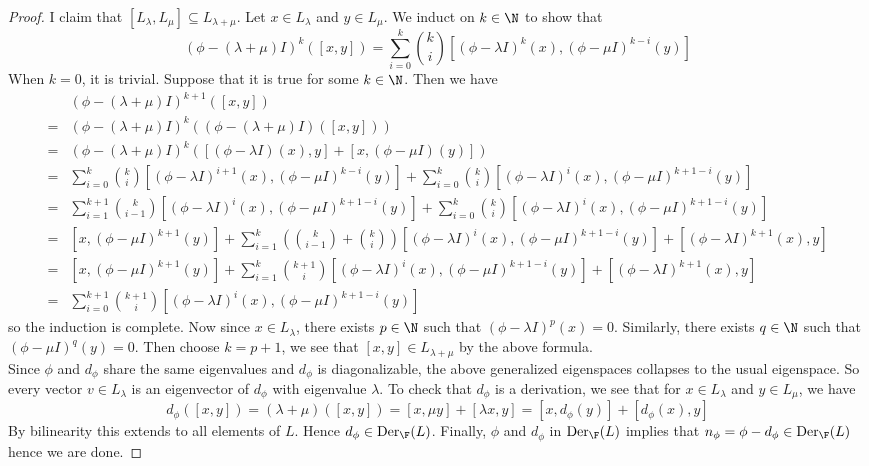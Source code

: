 \documentclass[a4paper]{article}
\begin{document}
\begin{lmm}{}{}
\begin{proof}
I claim that $[L_\lambda,L_\mu]\subseteq L_{\lambda+\mu}$. Let $x\in L_\lambda$ and $y\in L_\mu$. We induct on $k\in\N$ to show that $$(\phi-(\lambda+\mu)I)^k([x,y])=\sum_{i=0}^k\binom{k}{i}\left[(\phi-\lambda I)^k(x),(\phi-\mu I)^{k-i}(y)\right]$$ When $k=0$, it is trivial. Suppose that it is true for some $k\in\N$. Then we have 
\begin{align*}
&(\phi-(\lambda+\mu)I)^{k+1}([x,y])\\
=&(\phi-(\lambda+\mu)I)^k((\phi-(\lambda+\mu)I)([x,y]))\\
=&(\phi-(\lambda+\mu)I)^k([(\phi-\lambda I)(x),y]+[x,(\phi-\mu I)(y)])\\
=&\sum_{i=0}^k\binom{k}{i}\left[(\phi-\lambda I)^{i+1}(x),(\phi-\mu I)^{k-i}(y)\right]+\sum_{i=0}^k\binom{k}{i}\left[(\phi-\lambda I)^i(x),(\phi-\mu I)^{k+1-i}(y)\right]\\
=&\sum_{i=1}^{k+1}\binom{k}{i-1}\left[(\phi-\lambda I)^i(x),(\phi-\mu I)^{k+1-i}(y)\right]+\sum_{i=0}^k\binom{k}{i}\left[(\phi-\lambda I)^i(x),(\phi-\mu I)^{k+1-i}(y)\right]\\
=&\left[x,(\phi-\mu I)^{k+1}(y)\right]+\sum_{i=1}^k\left(\binom{k}{i-1}+\binom{k}{i}\right)\left[(\phi-\lambda I)^i(x),(\phi-\mu I)^{k+1-i}(y)\right]+\left[(\phi-\lambda I)^{k+1}(x),y\right]\\
=&\left[x,(\phi-\mu I)^{k+1}(y)\right]+\sum_{i=1}^k\binom{k+1}{i}\left[(\phi-\lambda I)^i(x),(\phi-\mu I)^{k+1-i}(y)\right]+\left[(\phi-\lambda I)^{k+1}(x),y\right]\\
=&\sum_{i=0}^{k+1}\binom{k+1}{i}\left[(\phi-\lambda I)^i(x),(\phi-\mu I)^{k+1-i}(y)\right]
\end{align*}
so the induction is complete. Now since $x\in L_\lambda$, there exists $p\in\N$ such that $(\phi-\lambda I)^p(x)=0$. Similarly, there exists $q\in\N$ such that $(\phi-\mu I)^q(y)=0$. Then choose $k=p+1$, we see that $[x,y]\in L_{\lambda+\mu}$ by the above formula. \\

Since $\phi$ and $d_\phi$ share the same eigenvalues and $d_\phi$ is diagonalizable, the above generalized eigenspaces collapses to the usual eigenspace. So every vector $v\in L_\lambda$ is an eigenvector of $d_\phi$ with eigenvalue $\lambda$. To check that $d_\phi$ is a derivation, we see that for $x\in L_\lambda$ and $y\in L_\mu$, we have $$d_\phi([x,y])=(\lambda+\mu)([x,y])=[x,\mu y]+[\lambda x,y]=[x,d_\phi(y)]+[d_\phi(x),y]$$ By bilinearity this extends to all elements of $L$. Hence $d_\phi\in\text{Der}_\F(L)$. Finally, $\phi$ and $d_\phi$ in $\text{Der}_\F(L)$ implies that $n_\phi=\phi-d_\phi\in\text{Der}_\F(L)$ hence we are done. 
\end{proof}
\end{lmm}
\end{document}
